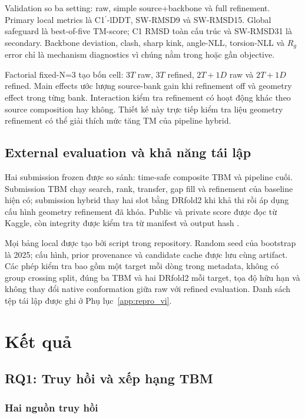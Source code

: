 \documentclass[12pt,a4paper,oneside]{report}
\newcommand{\cprime}{C1$^{\prime}$}
\begin{document}
Validation so ba setting: raw, simple source+backbone và full refinement. Primary local
metrics là \cprime{}-lDDT, SW-RMSD9 và SW-RMSD15. Global safeguard là best-of-five
TM-score; C1 RMSD toàn cấu trúc và SW-RMSD31 là secondary. Backbone deviation, clash,
sharp kink, angle-NLL, torsion-NLL và $R_g$ error chỉ là mechanism diagnostics vì chúng
nằm trong hoặc gần objective.

Factorial fixed-N=3 tạo bốn cell: $3T$ raw, $3T$ refined, $2T+1D$ raw và $2T+1D$
refined. Main effects ước lượng source-bank gain khi refinement off và geometry effect
trong từng bank. Interaction kiểm tra refinement có hoạt động khác theo source composition
hay không. Thiết kế này trực tiếp kiểm tra liệu geometry refinement có thể giải thích
mức tăng TM của pipeline hybrid.

\section{External evaluation và khả năng tái lập}

Hai submission frozen được so sánh: time-safe composite TBM và pipeline cuối. Submission
TBM chạy search, rank, transfer, gap fill và refinement của baseline hiện có; submission
hybrid thay hai slot bằng DRfold2 khi khả thi rồi áp dụng cấu hình geometry refinement đã
khóa. Public và private score được đọc từ Kaggle, còn integrity được kiểm tra từ manifest
và output hash \cite{kaggle_competition}.

Mọi bảng local được tạo bởi script trong repository. Random seed của bootstrap là 2025;
cấu hình, prior provenance và candidate cache được lưu cùng artifact. Các phép kiểm tra
bao gồm một target mỗi dòng trong metadata, không có group crossing split, đúng ba TBM
và hai DRfold2 mỗi target, tọa độ hữu hạn và không thay đổi native conformation giữa raw
với refined evaluation. Danh sách tệp tái lập được ghi ở Phụ lục~\ref{app:repro_vi}.

\chapter{Kết quả}
\label{chap:results_vi}

\section{RQ1: Truy hồi và xếp hạng TBM}

\subsection{Hai nguồn truy hồi}
\end{document}
